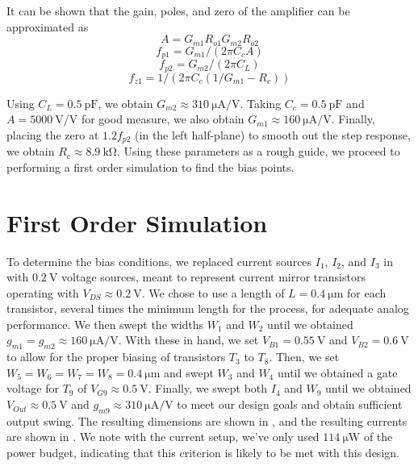 \documentclass[journal,hidelinks]{IEEEtran}
\begin{document}
It can be shown \cite{sedra_microelectronic_2015} that the gain, poles, and zero of the amplifier can be approximated as 
\[ A = G_{m1} R_{o1} G_{m2} R_{o2} \]
\[ f_{p1} = G_{m1} / (2 \pi C_c A) \]
\[ f_{p2} = G_{m2} / (2 \pi C_L)\]
\[ f_{z1} = 1 / (2 \pi C_c (1 / G_{m1} - R_c)) \]

Using $C_L = \SI{0.5}{\pico\farad}$, we obtain $G_{m2} \approx \SI{310}{\micro\ampere\per\volt}$. Taking $C_c = \SI{0.5}{\pico\farad}$ and $A = \SI{5000}{\volt\per\volt}$ for good measure, we also obtain $G_{m1} \approx \SI{160}{\micro\ampere\per\volt}$. Finally, placing the zero at $1.2 f_{p2}$ (in the left half-plane) to smooth out the step response, we obtain $R_c \approx \SI{8.9}{\kilo\ohm}$. Using these parameters as a rough guide, we proceed to performing a first order simulation to find the bias points.

\section{First Order Simulation}

To determine the bias conditions, we replaced current sources $I_1$, $I_2$, and $I_3$ in  with $\SI{0.2}{\volt}$ voltage sources, meant to represent current mirror transistors operating with $V_{DS} \approx \SI{0.2}{\volt}$. We chose to use a length of $L = \SI{0.4}{\micro\meter}$ for each transistor, several times the minimum length for the process, for adequate analog performance. We then swept the widths $W_1$ and $W_2$ until we obtained $g_{m1} = g_{m2} \approx \SI{160}{\micro\ampere\per\volt}$. With these in hand, we set $V_{B1} = \SI{0.55}{\volt}$ and $V_{B2} = \SI{0.6}{\volt}$ to allow for the proper biasing of transistors $T_3$ to $T_8$. Then, we set $W_5 = W_6 = W_7 = W_8 = \SI{0.4}{\micro\meter}$ and swept $W_3$ and $W_4$ until we obtained a gate voltage for $T_9$ of $V_{G9} \approx \SI{0.5}{\volt}$. Finally, we swept both $I_4$ and $W_9$ until we obtained $V_{Out} \approx \SI{0.5}{\volt}$ and $g_{m9} \approx \SI{310}{\micro\ampere\per\volt}$ to meet our design goals and obtain sufficient output swing. The resulting dimensions are shown in , and the resulting currents are shown in . We note with the current setup, we've only used $\SI{114}{\micro\watt}$ of the power budget, indicating that this criterion is likely to be met with this design.

\begin{table}[!htb]
  \centering
  \caption{Transistor dimensions obtained after a first order simulation of the amplifier.}
  \label{tab:dim-first-order}
\end{table}
\end{document}
